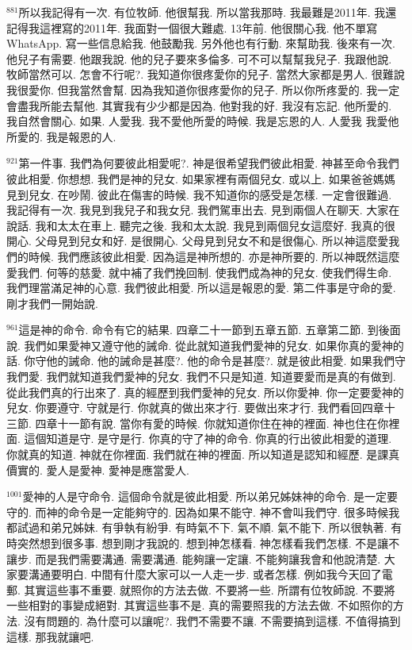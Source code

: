 \documentclass{book}
\begin{document}
$^{881}$所以我記得有一次.
有位牧師.
他很幫我.
所以當我那時.
我最難是2011年.
我還記得我這裡寫的2011年.
我面對一個很大難處.
13年前.
他很關心我.
他不單寫WhatsApp.
寫一些信息給我.
他鼓勵我.
另外他也有行動.
來幫助我.
後來有一次.
他兒子有需要.
他跟我說.
他的兒子要來多倫多.
可不可以幫幫我兒子.
我跟他說.
牧師當然可以.
怎會不行呢?.
我知道你很疼愛你的兒子.
當然大家都是男人.
很難說我很愛你.
但我當然會幫.
因為我知道你很疼愛你的兒子.
所以你所疼愛的.
我一定會盡我所能去幫他.
其實我有少少都是因為.
他對我的好.
我沒有忘記.
他所愛的.
我自然會關心.
如果.
人愛我.
我不愛他所愛的時候.
我是忘恩的人.
人愛我 我愛他所愛的.
我是報恩的人.

$^{921}$第一件事.
我們為何要彼此相愛呢?.
神是很希望我們彼此相愛.
神甚至命令我們彼此相愛.
你想想.
我們是神的兒女.
如果家裡有兩個兒女.
或以上.
如果爸爸媽媽見到兒女.
在吵鬧.
彼此在傷害的時候.
我不知道你的感受是怎樣.
一定會很難過.
我記得有一次.
我見到我兒子和我女兒.
我們駕車出去.
見到兩個人在聊天.
大家在說話.
我和太太在車上.
聽完之後.
我和太太說.
我見到兩個兒女這麼好.
我真的很開心.
父母見到兒女和好.
是很開心.
父母見到兒女不和是很傷心.
所以神這麼愛我們的時候.
我們應該彼此相愛.
因為這是神所想的.
亦是神所要的.
所以神既然這麼愛我們.
何等的慈愛.
就中補了我們挽回制.
使我們成為神的兒女.
使我們得生命.
我們理當滿足神的心意.
我們彼此相愛.
所以這是報恩的愛.
第二件事是守命的愛.
剛才我們一開始說.

$^{961}$這是神的命令.
命令有它的結果.
四章二十一節到五章五節.
五章第二節.
到後面說.
我們如果愛神又遵守他的誡命.
從此就知道我們愛神的兒女.
如果你真的愛神的話.
你守他的誡命.
他的誡命是甚麼?.
他的命令是甚麼?.
就是彼此相愛.
如果我們守我們愛.
我們就知道我們愛神的兒女.
我們不只是知道.
知道要愛而是真的有做到.
從此我們真的行出來了.
真的經歷到我們愛神的兒女.
所以你愛神.
你一定要愛神的兒女.
你要遵守.
守就是行.
你就真的做出來才行.
要做出來才行.
我們看回四章十三節.
四章十一節有說.
當你有愛的時候.
你就知道你住在神的裡面.
神也住在你裡面.
這個知道是守.
是守是行.
你真的守了神的命令.
你真的行出彼此相愛的道理.
你就真的知道.
神就在你裡面.
我們就在神的裡面.
所以知道是認知和經歷.
是課真價實的.
愛人是愛神.
愛神是應當愛人.

$^{1001}$愛神的人是守命令.
這個命令就是彼此相愛.
所以弟兄姊妹神的命令.
是一定要守的.
而神的命令是一定能夠守的.
因為如果不能守.
神不會叫我們守.
很多時候我都試過和弟兄姊妹.
有爭執有紛爭.
有時氣不下.
氣不順.
氣不能下.
所以很執著.
有時突然想到很多事.
想到剛才我說的.
想到神怎樣看.
神怎樣看我們怎樣.
不是讓不讓步.
而是我們需要溝通.
需要溝通.
能夠讓一定讓.
不能夠讓我會和他說清楚.
大家要溝通要明白.
中間有什麼大家可以一人走一步.
或者怎樣.
例如我今天回了電郵.
其實這些事不重要.
就照你的方法去做.
不要將一些.
所謂有位牧師說.
不要將一些相對的事變成絕對.
其實這些事不是.
真的需要照我的方法去做.
不如照你的方法.
沒有問題的.
為什麼可以讓呢?.
我們不需要不讓.
不需要搞到這樣.
不值得搞到這樣.
那我就讓吧.
\end{document}
